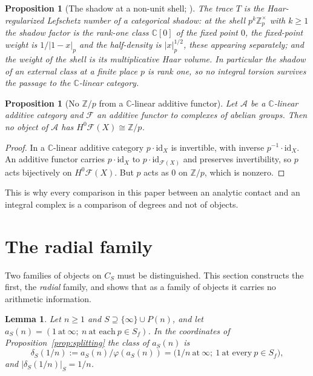 \documentclass[11pt]{amsart}
\newtheorem{proposition}[theorem]{Proposition}
\newtheorem{lemma}[theorem]{Lemma}
\theoremstyle{definition}
\theoremstyle{remark}
\newcommand{\C}{\mathbb C}
\newcommand{\Z}{\mathbb Z}
\begin{document}
\begin{proposition}[The shadow at a non-unit shell;
{\cite[Thm.~5.10, Prop.~6.12]{Companion}}]\label{prop:shadow}
The trace $T$ is the Haar-regularized Lefschetz number of a categorical
shadow: at the shell $p^k\Z_p^\times$ with $k\ge1$ the shadow factor is the
rank-one class $\C[0]$ of the fixed point $0$, the fixed-point weight is
$1/|1-x|_p$ and the half-density is $|x|_p^{1/2}$, these appearing separately;
and the weight of the shell is its multiplicative Haar volume. In particular
the shadow of an external class at a finite place $p$ is rank one, so no
integral torsion survives the passage to the $\C$-linear category.
\end{proposition}

\begin{proposition}[No $\Z/p$ from a $\C$-linear additive functor]
\label{prop:noZp}
Let $\mathcal A$ be a $\C$-linear additive category and $\mathcal F$ an
additive functor to complexes of abelian groups. Then no object of
$\mathcal A$ has $H^0\mathcal F(X)\cong\Z/p$.
\end{proposition}

\begin{proof}
In a $\C$-linear additive category $p\cdot\mathrm{id}_X$ is invertible, with
inverse $p^{-1}\cdot\mathrm{id}_X$. An additive functor carries
$p\cdot\mathrm{id}_X$ to $p\cdot\mathrm{id}_{\mathcal F(X)}$ and preserves
invertibility, so $p$ acts bijectively on $H^0\mathcal F(X)$. But $p$ acts as
$0$ on $\Z/p$, which is nonzero.
\end{proof}

This is why every comparison in this paper between an analytic contact and an
integral complex is a comparison of degrees and not of objects.

\section{The radial family}\label{sec:radial}

Two families of objects on $C_S$ must be distinguished.  This section
constructs the first, the \emph{radial} family, and shows that as a family of
objects it carries no arithmetic information.

\begin{lemma}\label{lem:classunit}
Let $n\ge1$ and $S\supseteq\{\infty\}\cup P(n)$, and let
$a_S(n)=(1\ \text{at}\ \infty;\ n\ \text{at each}\ p\in S_f)$. In the
coordinates of Proposition~\ref{prop:splitting} the class of $a_S(n)$ is
\begin{equation}\label{eq:deltaS}
  \delta_S(1/n):=a_S(n)/\varphi(a_S(n))
   =\bigl(1/n\ \text{at}\ \infty;\ 1\ \text{at every}\ p\in S_f\bigr),
\end{equation}
and $|\delta_S(1/n)|_S=1/n$.
\end{lemma}
\end{document}
